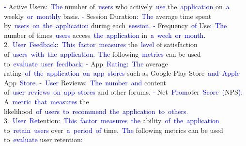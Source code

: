 \begin{tcolorbox}[colframe=gray!70!black,colback=white, title=Sample 6]
{}\textcolor{blue}{-} Active Users\textcolor{blue}{:}\textcolor{blue}{~The} number of\textcolor{blue}{~users} who actively\textcolor{blue}{~use} the\textcolor{blue}{~application} on\textcolor{blue}{~a} weekly\textcolor{blue}{~or}\textcolor{blue}{~monthly} basis\textcolor{blue}{.
}\textcolor{blue}{-} Session Duration\textcolor{blue}{:}\textcolor{blue}{~The} average time spent by\textcolor{blue}{~users}\textcolor{blue}{~on}\textcolor{blue}{~the}\textcolor{blue}{~application} during each\textcolor{blue}{~session}\textcolor{blue}{.
}\textcolor{blue}{-} Frequency\textcolor{blue}{~of} Use\textcolor{blue}{:}\textcolor{blue}{~The} number of times\textcolor{blue}{~users} access\textcolor{blue}{~the}\textcolor{blue}{~application} in\textcolor{blue}{~a}\textcolor{blue}{~week}\textcolor{blue}{~or}\textcolor{blue}{~month}\textcolor{blue}{.
}2.\textcolor{blue}{~User}\textcolor{blue}{~Feedback}\textcolor{blue}{:}\textcolor{blue}{~This}\textcolor{blue}{~factor}\textcolor{blue}{~measures} the\textcolor{blue}{~level} of satisfaction of\textcolor{blue}{~users}\textcolor{blue}{~with}\textcolor{blue}{~the}\textcolor{blue}{~application}\textcolor{blue}{.}\textcolor{blue}{~The} following\textcolor{blue}{~metrics} can be used to\textcolor{blue}{~evaluate}\textcolor{blue}{~user}\textcolor{blue}{~feedback}\textcolor{blue}{:
}\textcolor{blue}{-} App\textcolor{blue}{~Rating}\textcolor{blue}{:}\textcolor{blue}{~The} average rating\textcolor{blue}{~of}\textcolor{blue}{~the}\textcolor{blue}{~application}\textcolor{blue}{~on}\textcolor{blue}{~app}\textcolor{blue}{~stores} such as Google Play Store\textcolor{blue}{~and}\textcolor{blue}{~Apple} App\textcolor{blue}{~Store}\textcolor{blue}{.
}-\textcolor{blue}{~User} Reviews\textcolor{blue}{:}\textcolor{blue}{~The}\textcolor{blue}{~number}\textcolor{blue}{~and} content of\textcolor{blue}{~user}\textcolor{blue}{~reviews}\textcolor{blue}{~on}\textcolor{blue}{~app}\textcolor{blue}{~stores} and other forums.
\textcolor{blue}{-} Net\textcolor{blue}{~Prom}oter\textcolor{blue}{~Score}\textcolor{blue}{~(}NPS\textcolor{blue}{):} A\textcolor{blue}{~metric}\textcolor{blue}{~that}\textcolor{blue}{~measures} the likelihood\textcolor{blue}{~of}\textcolor{blue}{~users}\textcolor{blue}{~to}\textcolor{blue}{~recommend}\textcolor{blue}{~the}\textcolor{blue}{~application}\textcolor{blue}{~to}\textcolor{blue}{~others}\textcolor{blue}{.
}3.\textcolor{blue}{~User}\textcolor{blue}{~Ret}ention\textcolor{blue}{:}\textcolor{blue}{~This}\textcolor{blue}{~factor}\textcolor{blue}{~measures}\textcolor{blue}{~the} ability\textcolor{blue}{~of}\textcolor{blue}{~the}\textcolor{blue}{~application} to\textcolor{blue}{~retain}\textcolor{blue}{~users} over\textcolor{blue}{~a}\textcolor{blue}{~period}\textcolor{blue}{~of} time\textcolor{blue}{.}\textcolor{blue}{~The} following metrics can be used to\textcolor{blue}{~evaluate} user retention\textcolor{blue}{:
}
\end{tcolorbox}
